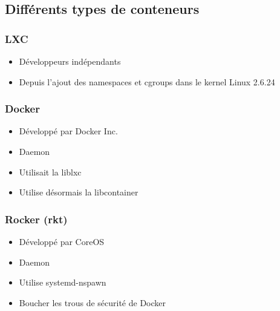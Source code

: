 \subsection[Conteneurs]{Différents types de conteneurs}

  \begin{frame}
     \frametitle{LXC}
    \begin{itemize}
      \item Développeurs indépendants
      \item Depuis l'ajout des namespaces et cgroups dans le kernel Linux 2.6.24
    \end{itemize}
  \end{frame}

 \begin{frame}
     \frametitle{Docker}
    \begin{itemize}
      \item Développé par Docker Inc.
      \item Daemon
      \item Utilisait la liblxc
      \item Utilise désormais la libcontainer
    \end{itemize}
  \end{frame}

   \begin{frame}
     \frametitle{Rocker (rkt)}
    \begin{itemize}
      \item Développé par CoreOS
      \item Daemon
      \item Utilise systemd-nspawn
      \item Boucher les trous de sécurité de Docker
    \end{itemize}
  \end{frame}
